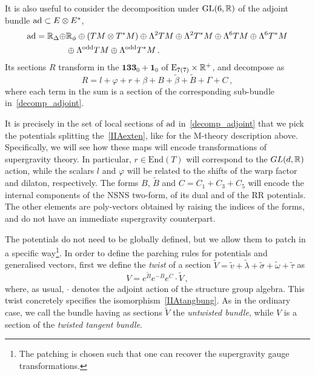 \documentclass[debug]{phd}
\begin{document}
					It is also useful to consider the decomposition under $\mathrm{GL}(6,\mathbb{R})$ of the adjoint bundle $\operatorname{ad} \subset E \otimes E^*$, 
							\begin{equation}\label{decomp_adjoint}
								\begin{split}
									\operatorname{ad} = 	\mathbb{R}_\Delta \oplus& \mathbb{R}_\phi \oplus (TM\otimes T^*M) \oplus \Lambda^2 TM \oplus \Lambda^2 T^*M \oplus \Lambda^6 TM \oplus \Lambda^6 T^*M \\
											& \oplus \Lambda^{\mathrm{odd}} TM \oplus \Lambda^{\text{odd}} T^*M \, .
								\end{split}
							\end{equation}
					Its sections $R$ transform in the $\mathbf{133}_0 + \mathbf{1}_0$ of $\mathrm{E}_{7(7)}\times \mathbb{R}^+$, and decompose as 
							\begin{equation}\label{section_adjoint}
								R = l + \varphi + r + \beta + B + \tilde \beta + \tilde B + \Gamma + C \, ,
							\end{equation} 
					where each term in the sum is a section of the corresponding sub-bundle in~\eqref{decomp_adjoint}.
					
					It is precisely in the set of local sections of $\operatorname{ad}$ in~\eqref{decomp_adjoint} that we pick the potentials splitting the~\eqref{IIAexten}, like for the M-theory description above.
					Specifically, we will see how these maps will encode transformations of supergravity theory.
					In particular, $r \in \mathrm{End}(T)$ will correspond to the $GL(d,\mathbb{R})$ action, while the scalars $l$ and $\varphi$ will be related to the shifts of the warp factor and dilaton, respectively. 
					The forms $B$, $\tilde B$ and $C = C_1 + C_3 + C_5$ will encode the internal components of the NSNS two-form, of its dual and of the RR potentials.
					The other elements are poly-vectors obtained by raising the indices of the forms, and do not have an immediate supergravity counterpart.
					
					The potentials do not need to be globally defined, but we allow them to patch in a specific way\footnote{%
						The patching is chosen such that one can recover the supergravity gauge transformations.
						}.
					In order to define the parching rules for potentials and generalised vectors, first we define the \emph{twist} of a section $\tilde{V} = \tilde{v} + \tilde{\lambda} + \tilde{\sigma} + \tilde{\omega} + \tilde{\tau}$ as
							\begin{equation}\label{eq:twistC_short}
								V = e^{\tilde{B}} e^{-B} e^C \cdot \tilde{V} \, ,
							\end{equation}
					where, as usual, $\cdot$ denotes the adjoint action of the structure group algebra.
					This twist concretely specifies the isomorphism~\eqref{IIAtangbung}.
					As in the ordinary case, we call the bundle having as sections $\tilde{V}$ the \emph{untwisted bundle}, while $V$ is a section of the \emph{twisted tangent bundle}.
					
\end{document}
